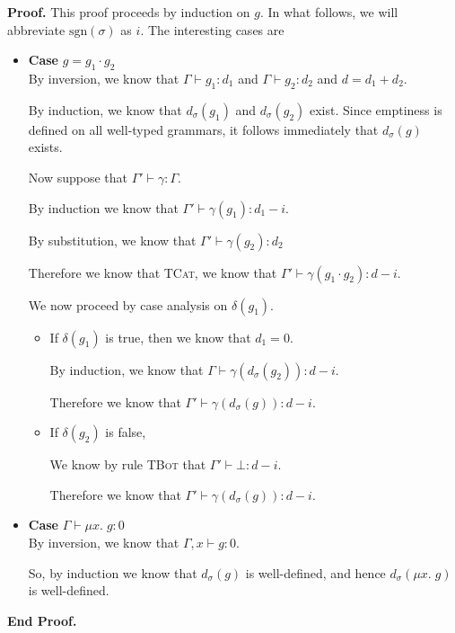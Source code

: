 \documentclass{article}
\newcommand{\fix}[2]{\mu {#1}.\;{#2}}
\newcommand{\judgebalance}[3][\Gamma]{{#1} \vdash {#2} : {#3}}
\newcommand{\judgesubst}[3]{{#1} \vdash {#2} : {#3}}
\newcommand{\deriv}[2]{d_{#1}({#2})}
\newcommand{\emptify}[1]{\delta({#1})}
\newenvironment{proof}{\noindent\textbf{Proof.}}
{\noindent\textbf{End Proof.}}
\newenvironment{caseblock}{\begin{itemize}}{\end{itemize}}
\newenvironment{case}[1]{\item \textbf{Case} {#1}\\}{}
\begin{document}
\begin{proof}
  This proof proceeds by induction on $g$. In what follows, we will 
  abbreviate $\mathrm{sgn}(\sigma)$ as $i$. The interesting cases are
  \begin{caseblock}
    \begin{case}{$g = g_1\cdot g_2$}
      By inversion, we know that $\judgebalance{g_1}{d_1}$ and 
      $\judgebalance{g_2}{d_2}$ and $d = d_1 + d_2$. 

      By induction, we know that $\deriv{\sigma}{g_1}$ and $\deriv{\sigma}{g_2}$ 
      exist. Since emptiness is defined on all well-typed grammars, it follows
      immediately that $\deriv{\sigma}{g}$ exists. 

      Now suppose that $\judgesubst{\Gamma'}{\gamma}{\Gamma}$. 

      By induction we know that $\judgebalance[\Gamma']{\gamma(g_1)}{d_1 - i}$. 
      
      By substitution, we know that $\judgebalance[\Gamma']{\gamma(g_2)}{d_2}$
        
      Therefore we know that \textsc{TCat}, we know that $\judgebalance[\Gamma']{\gamma(g_1\cdot g_2)}{d - i}$. 

      We now proceed by  case analysis on $\emptify{g_1}$. 

      \begin{itemize}
        \item If $\emptify{g_1}$ is true, then we know that $d_1 = 0$. 
        
          By induction, we know that $\judgebalance[\Gamma]{\gamma(\deriv{\sigma}{g_2})}{d - i}$. 
          
          Therefore we know that $\judgebalance[\Gamma']{\gamma(\deriv{\sigma}{g})}{d - i}$. 

        \item If $\emptify{g_2}$ is false, 

          We know by rule \textsc{TBot} that $\judgebalance[\Gamma']{\bot}{d - i}$. 

          Therefore we know that $\judgebalance[\Gamma']{\gamma(\deriv{\sigma}{g})}{d - i}$. 
      \end{itemize}
    \end{case}

    \begin{case}{$\judgebalance{\fix{x}{g}}{0}$}
      By inversion, we know that $\judgebalance[\Gamma, x]{g}{0}$. 
      
      So, by induction we know that $\deriv{\sigma}{g}$ is well-defined, and hence 
      $\deriv{\sigma}{\fix{x}{g}}$ is well-defined. 


\end{case}
\end{caseblock}
\end{proof}
\end{document}
